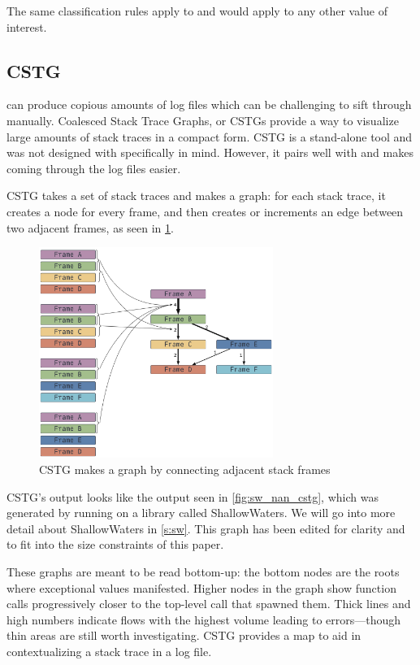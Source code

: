 \documentclass{juliacon}
\begin{document}
The same classification rules apply to \Inf{} and would apply to any other value of interest.

\subsection{CSTG}
\label{s:cstg}

\FT{} can produce copious amounts of log files which can be challenging to sift through manually.
Coalesced Stack Trace Graphs, or CSTGs\cite{humphreySystematicDebuggingMethods2014} provide a way to visualize large amounts of stack traces in a compact form.
CSTG is a stand-alone tool and was not designed with \FT{} specifically in mind.
However, it pairs well with \FT{} and makes coming through the log files easier.

CSTG takes a set of stack traces and makes a graph: for each stack trace, it creates a node for every frame, and then creates or increments an edge between two adjacent frames, as seen in \cref{fig:cstg_demo}.

\begin{figure}
  \centering
  \includegraphics[width=3in]{./fig/cstg_static_diagram.png}
  \caption{CSTG makes a graph by connecting adjacent stack frames}
  \label{fig:cstg_demo}
\end{figure}

CSTG's output looks like the output seen in \cref{fig:sw_nan_cstg}, which was generated by running \FT{} on a library called ShallowWaters.
We will go into more detail about ShallowWaters in \cref{s:sw}.
This graph has been edited for clarity and to fit into the size constraints of this paper.

These graphs are meant to be read bottom-up: the bottom nodes are the roots where exceptional values manifested.
Higher nodes in the graph show function calls progressively closer to the top-level call that spawned them.
Thick lines and high numbers indicate flows with the highest volume leading to errors---though thin areas are still worth investigating.
CSTG provides a map to aid in contextualizing a stack trace in a log file.
\end{document}

